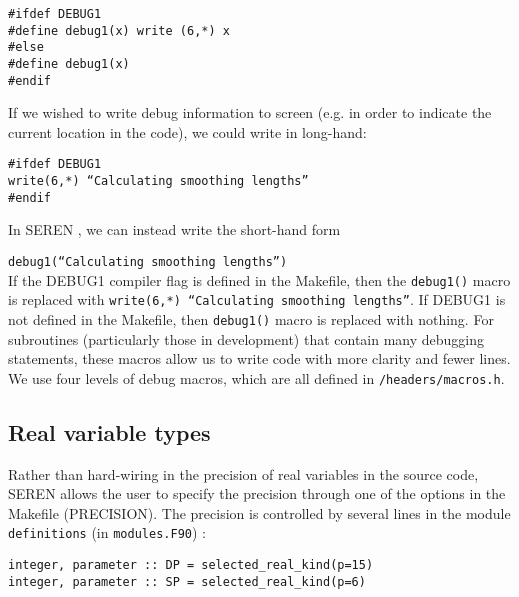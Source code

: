 \documentclass[a4paper]{article}
\newcommand{\NAME}{SEREN }
\newcommand{\var}[1]{\texttt{#1}}
\begin{document}
\noindent \var{\#ifdef DEBUG1} \\
\var{\#define debug1(x)   write (6,*) x} \\
\var{\#else} \\
\var{\#define debug1(x)} \\
\var{\#endif} \newline

If we wished to write debug information to screen (e.g. in order to indicate the current location in the code), we could write in long-hand: \newline

\noindent \var{\#ifdef DEBUG1} \\ 
\var{write(6,*) ``Calculating smoothing lengths''} \\ 
\var{\#endif} \newline

In \NAME, we can instead write the short-hand form 
\newline

\noindent \var{debug1(``Calculating smoothing lengths'')} \\

If the DEBUG1 compiler flag is defined in the Makefile, then the 
\var{debug1()} macro is replaced with 
\var{write(6,*) ``Calculating smoothing lengths''}.  
If DEBUG1 is not defined in the Makefile, then \var{debug1()} macro is replaced with nothing. For subroutines (particularly those in development) that contain many debugging statements, these macros allow us to write code with more clarity and fewer lines. We use four levels of debug macros, which are all defined in \var{/headers/macros.h}. 



\subsection{Real variable types} \label{SS:VARTYPES}
Rather than hard-wiring in the precision of real variables in the source code, \NAME allows the user to specify the precision through one of the options in the Makefile (PRECISION).  The precision is controlled by several lines in the module \var{definitions} (in \var{modules.F90}) : \newline

\indent \var{integer, parameter :: DP = selected\_real\_kind(p=15)} \\
\indent \var{integer, parameter :: SP = selected\_real\_kind(p=6)}  \\ 
\end{document}
